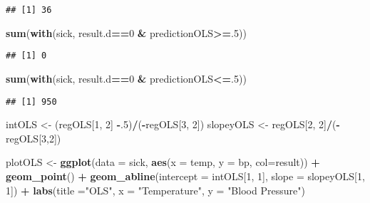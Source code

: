 \documentclass[]{article}
\newenvironment{Shaded}{\begin{snugshade}}{\end{snugshade}}
\newcommand{\KeywordTok}[1]{\textcolor[rgb]{0.13,0.29,0.53}{\textbf{#1}}}
\newcommand{\DataTypeTok}[1]{\textcolor[rgb]{0.13,0.29,0.53}{#1}}
\newcommand{\DecValTok}[1]{\textcolor[rgb]{0.00,0.00,0.81}{#1}}
\newcommand{\StringTok}[1]{\textcolor[rgb]{0.31,0.60,0.02}{#1}}
\newcommand{\OperatorTok}[1]{\textcolor[rgb]{0.81,0.36,0.00}{\textbf{#1}}}
\newcommand{\NormalTok}[1]{#1}
\begin{document}
\begin{verbatim}
## [1] 36
\end{verbatim}

\begin{Shaded}
\begin{Highlighting}[]
\KeywordTok{sum}\NormalTok{(}\KeywordTok{with}\NormalTok{(sick, result.d}\OperatorTok{==}\DecValTok{0} \OperatorTok{&}\StringTok{ }\NormalTok{predictionOLS}\OperatorTok{>=}\NormalTok{.}\DecValTok{5}\NormalTok{))}
\end{Highlighting}
\end{Shaded}

\begin{verbatim}
## [1] 0
\end{verbatim}

\begin{Shaded}
\begin{Highlighting}[]
\KeywordTok{sum}\NormalTok{(}\KeywordTok{with}\NormalTok{(sick, result.d}\OperatorTok{==}\DecValTok{0} \OperatorTok{&}\StringTok{ }\NormalTok{predictionOLS}\OperatorTok{<=}\NormalTok{.}\DecValTok{5}\NormalTok{))}
\end{Highlighting}
\end{Shaded}

\begin{verbatim}
## [1] 950
\end{verbatim}

\begin{Shaded}
\begin{Highlighting}[]
\NormalTok{intOLS <-}\StringTok{ }\NormalTok{(regOLS[}\DecValTok{1}\NormalTok{, }\DecValTok{2}\NormalTok{] }\OperatorTok{-}\NormalTok{.}\DecValTok{5}\NormalTok{)}\OperatorTok{/}\NormalTok{(}\OperatorTok{-}\NormalTok{regOLS[}\DecValTok{3}\NormalTok{, }\DecValTok{2}\NormalTok{]) }
\NormalTok{slopeyOLS <-}\StringTok{ }\NormalTok{regOLS[}\DecValTok{2}\NormalTok{, }\DecValTok{2}\NormalTok{]}\OperatorTok{/}\NormalTok{(}\OperatorTok{-}\NormalTok{regOLS[}\DecValTok{3}\NormalTok{,}\DecValTok{2}\NormalTok{])}
\end{Highlighting}
\end{Shaded}

\begin{Shaded}
\begin{Highlighting}[]
\NormalTok{plotOLS <-}\StringTok{ }\KeywordTok{ggplot}\NormalTok{(}\DataTypeTok{data =}\NormalTok{ sick, }\KeywordTok{aes}\NormalTok{(}\DataTypeTok{x =}\NormalTok{ temp, }\DataTypeTok{y =}\NormalTok{ bp, }\DataTypeTok{col=}\NormalTok{result)) }\OperatorTok{+}\StringTok{ }\KeywordTok{geom_point}\NormalTok{() }\OperatorTok{+}\StringTok{ }\KeywordTok{geom_abline}\NormalTok{(}\DataTypeTok{intercept =}\NormalTok{ intOLS[}\DecValTok{1}\NormalTok{, }\DecValTok{1}\NormalTok{], }\DataTypeTok{slope =}\NormalTok{ slopeyOLS[}\DecValTok{1}\NormalTok{, }\DecValTok{1}\NormalTok{]) }\OperatorTok{+}\StringTok{ }\KeywordTok{labs}\NormalTok{(}\DataTypeTok{title =}\StringTok{"OLS"}\NormalTok{, }\DataTypeTok{x =} \StringTok{"Temperature"}\NormalTok{, }\DataTypeTok{y =} \StringTok{"Blood Pressure"}\NormalTok{)}
\end{Highlighting}
\end{Shaded}
\end{document}

